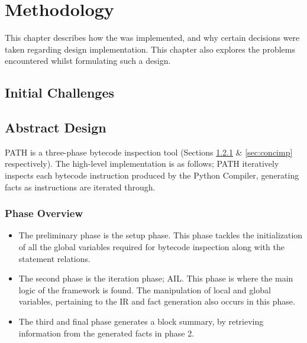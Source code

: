 \chapter{Methodology}
    \par This chapter describes how the  was implemented, and why certain decisions were taken regarding design implementation. This chapter also explores the problems encountered whilst formulating such a design.
    \section{Initial Challenges}

    \section{Abstract Design}
    \par PATH is a three-phase bytecode inspection tool (Sections \ref{subsec:phaseoverview} \& \ref{sec:concimp} respectively). The high-level implementation is as follows; 
    PATH iteratively inspects each bytecode instruction produced by the Python Compiler, generating facts as instructions are iterated through. 
        \subsection{Phase Overview}
        \label{subsec:phaseoverview}
        \begin{itemize}
            \item[1.] The preliminary phase is the setup phase. This phase tackles the initialization of all the global variables required for bytecode inspection along with the statement relations.
            \item[2.] The second phase is the iteration phase; \acs{AIL}. This phase is where the main logic of the framework is found. The manipulation of local and global variables, pertaining to the IR and fact generation also occurs in this phase.
            \item[3.] The third and final phase generates a block summary, by retrieving information from the generated facts in phase 2.   
        \end{itemize}
        
